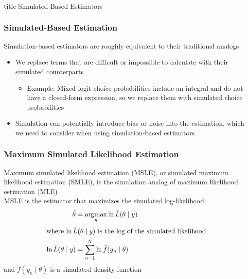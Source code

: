 \documentclass{beamer}
\DeclareMathOperator*{\argmax}{argmax}
\begin{document}
\begin{frame}\frametitle{}
    \vfill
    \centering
    \begin{beamercolorbox}[center]{title}
        \Large Simulated-Based Estimators
    \end{beamercolorbox}
    \vfill
\end{frame}

\begin{frame}\frametitle{Simulated-Based Estimation}
    Simulation-based estimators are roughly equivalent to their traditional analogs
    \begin{itemize}
        \item We replace terms that are difficult or impossible to calculate with their simulated counterparts
        \begin{itemize}
            \item Example: Mixed logit choice probabilities include an integral and do not have a closed-form expression, so we replace them with simulated choice probabilities
        \end{itemize}
        \item Simulation can potentially introduce bias or noise into the estimation, which we need to consider when using simulation-based estimators
    \end{itemize}
\end{frame}

\begin{frame}\frametitle{Maximum Simulated Likelihood Estimation}
    Maximum simulated likelihood estimation (MSLE), or simulated maximum likelihood estimation (SMLE), is the simulation analog of maximum likelihood estimation (MLE) \\
    \vspace{2ex}
    MSLE is the estimator that maximizes the simulated log-likelihood
    \begin{align*}
        \hat{\theta} &= \argmax_\theta \ln \check{L}(\theta \mid y) \\
        \intertext{where $\ln \check{L}(\theta \mid y)$ is the log of the simulated likelihood}
        \ln \check{L}(\theta \mid y) &= \sum_{n = 1}^N \ln \check{f}(y_n \mid \theta)
    \end{align*}
    and $\check{f}(y_n \mid \theta)$ is a simulated density function
\end{frame}
\end{document}
